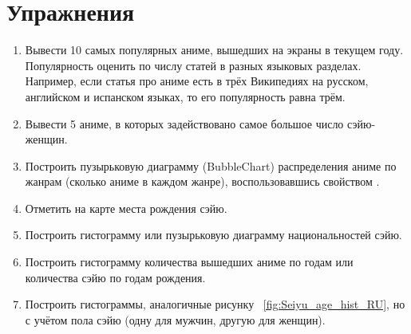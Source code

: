 \newpage

\section{Упражнения}

\begin{enumerate}
    \item Вывести 10 самых популярных аниме, вышедших на экраны в текущем году. Популярность оценить по числу статей в разных языковых разделах. Например, если статья про аниме есть в трёх Википедиях на русском, английском и испанском языках, то его популярность равна трём. 
    \item Вывести 5 аниме, в которых задействовано самое большое число сэйю-женщин.
    \item Построить пузырьковую диаграмму (BubbleChart) распределения аниме по жанрам (сколько аниме в каждом жанре), воспользовавшись свойством .
    \item Отметить на карте места рождения сэйю.
    \item Построить гистограмму или пузырьковую диаграмму национальностей сэйю.
    \item Построить гистограмму количества вышедших аниме по годам или количества сэйю по годам рождения.
    \item Построить гистограммы, аналогичные рисунку ~\ref{fig:Seiyu_age_hist_RU}, но с учётом пола сэйю (одну для мужчин, другую для женщин).
\end{enumerate}
